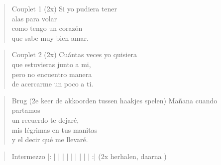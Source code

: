 \begin{verse}{Couplet 1 (2x)}
Si yo pudiera tener\\
alas para volar\\
como tengo un coraz\'{o}n\\
que sabe muy bien amar.\\
\end{verse}
\begin{verse}{Couplet 2 (2x)}
Cu\'{a}ntas veces yo quisiera\\
que estuvieras junto a mi,\\
pero no encuentro manera\\
de acercarme un poco a ti.\hspace{2em}
\end{verse}

\begin{verse}{Brug (2e keer de akkoorden tussen haakjes spelen)}
Ma\~{n}ana cuando partamos\\
un recuerdo te dejar\'{e},\hspace{2em}\hspace{5em}\\
mis l\'{e}grimas en tus manitas\\
y el decir qu\'{e} me llevar\'{e}.\\
\end{verse}
\begin{verse}{Intermezzo}
|:  |  \hspace{2em} | \hspace{3.9em} |  \hspace{2em} | \hspace{4em} |  \hspace{2em} |  \hspace{3em} |  \hspace{2em} | \hspace{0.3em} \hspace{2em} |  \hspace{2.55em} :| (2x herhalen, daarna )\\

\end{verse}


